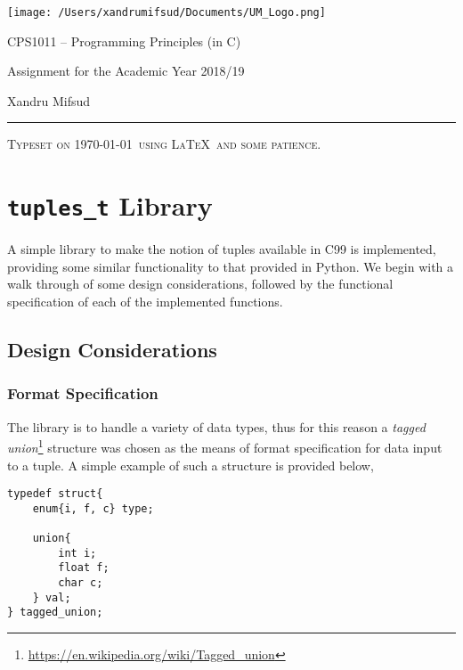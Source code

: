 \documentclass[10pt, a4paper, oneside]{memoir}
\makeatletter
\newcommand*{\toccontents}{\@starttoc{toc}}
\makeatother
\begin{document}
	
	\begin{center}
		
		\texttt{[image: /Users/xandrumifsud/Documents/UM\_Logo.png]}
		
		\LARGE CPS1011 -- Programming Principles (in C)
		
		\vspace{2mm}
		
		\large Assignment for the Academic Year 2018/19
		
		\vspace{0.5cm}
		
		\normalsize Xandru Mifsud
	\end{center}

	\noindent\rule[0.5ex]{\linewidth}{1pt}
	
	\toccontents
	
	\vspace*{\fill}
	\textsc{Typeset on \today \ using \LaTeX \ and some patience.}
	
	\newpage
	
	\chapter{\texttt{tuples_t} Library}
	
	A simple library to make the notion of tuples available in C99 is implemented, providing some similar functionality to that provided in Python. We begin with a walk through of some design considerations, followed by the functional specification of each of the implemented functions.
	
	\section{Design Considerations}
	
	\subsection{Format Specification}
	
	The library is to handle a variety of data types, thus for this reason a \textit{tagged union}\footnote{\href{https://en.wikipedia.org/wiki/Tagged_union}{https://en.wikipedia.org/wiki/Tagged\_union}} structure was chosen as the means of format specification for data input to a tuple. A simple example of such a structure is provided below,
\begin{verbatim}
typedef struct{
	enum{i, f, c} type;
	
	union{
		int i;
		float f;
		char c;
	} val;
} tagged_union;
\end{verbatim}
\end{document}
